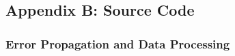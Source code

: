 \documentclass[a4paper]{article}
\begin{document}
\subsection{Appendix B: Source Code}

\subsubsection{Error Propagation and Data Processing}

\inputminted{julia}{Code/calcData.jl}
\end{document}
